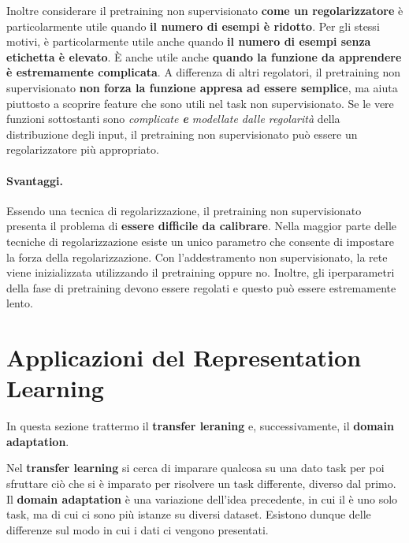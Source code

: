 Inoltre considerare il pretraining non supervisionato \textbf{come un regolarizzatore} è particolarmente 
utile quando \textbf{il numero di esempi è ridotto}.
\newline
Per gli stessi motivi, è particolarmente utile anche quando \textbf{il numero di esempi senza etichetta 
è elevato}. 
\newline
È anche utile anche \textbf{quando la funzione da apprendere è estremamente complicata}.
\newline
A differenza di altri regolatori, il pretraining non supervisionato \textbf{non forza la funzione appresa 
ad essere semplice}, ma aiuta piuttosto a scoprire feature che sono utili nel task non supervisionato.
\newline
Se le vere funzioni sottostanti sono \textit{complicate \textbf{e} modellate dalle regolarità} della 
distribuzione degli input, il pretraining non supervisionato può essere un regolarizzatore più appropriato.
\paragraph{Svantaggi.} Essendo una tecnica di regolarizzazione, il pretraining non supervisionato presenta 
il problema di \textbf{essere difficile da calibrare}.
\newline
Nella maggior parte delle tecniche di regolarizzazione esiste un unico parametro che consente di impostare 
la forza della regolarizzazione.
\newline
Con l'addestramento non supervisionato, la rete viene inizializzata utilizzando il pretraining oppure no.
\newline
Inoltre, gli iperparametri della fase di pretraining devono essere regolati e questo può essere estremamente
lento.
\newpage


\section{Applicazioni del Representation Learning}
In questa sezione trattermo il \textbf{transfer leraning} e, successivamente, il 
\textbf{domain adaptation}.


Nel \textbf{transfer learning} si cerca di imparare qualcosa su una dato task per poi sfruttare ciò che si è imparato
per risolvere un task differente, diverso dal primo. Il \textbf{domain adaptation} è una variazione dell'idea 
precedente, in cui il è uno solo task, ma di cui ci sono più istanze su diversi dataset. Esistono dunque delle
differenze sul modo in cui i dati ci vengono presentati. 


